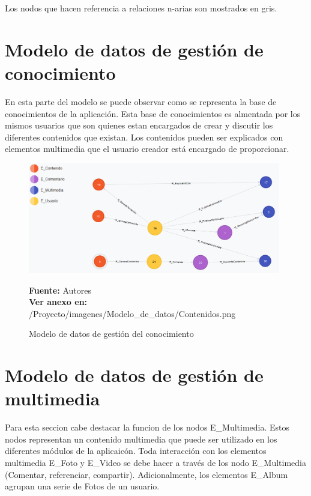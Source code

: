 Los nodos que hacen referencia a relaciones n-arias son mostrados en gris.

\section{Modelo de datos de gestión de conocimiento}

En esta parte del modelo se puede observar como se representa la base de conocimientos de la aplicación. Esta base de conocimientos es almentada por los mismos usuarios que son quienes estan encargados de crear y discutir los diferentes contenidos que existan. Los contenidos pueden ser explicados con elementos multimedia que el usuario creador está encargado de proporcionar.

\begin{figure}[!htb]
  \begin{center}
    \includegraphics[width=11cm]{./imagenes/Modelo_de_datos/Contenidos.png}
    \caption{Modelo de datos de gestión del conocimiento}
    \label{fig:modelo_datos_gestion_conocimiento}
    \textbf{Fuente:}  Autores \\
    \textbf{Ver anexo en:} /Proyecto/imagenes/Modelo\_de\_datos/Contenidos.png
  \end{center}
\end{figure}

\section{Modelo de datos de gestión de multimedia}

Para esta seccion cabe destacar la funcion de los nodos E\_Multimedia. Estos nodos representan un contenido multimedia que puede ser utilizado en los diferentes módulos de la aplicaicón. Toda interacción con los elementos multimedia E\_Foto y E\_Video se debe hacer a través de los nodo E\_Multimedia (Comentar, referenciar, compartir). Adicionalmente, los elementos E\_Album agrupan una serie de Fotos de un usuario.

